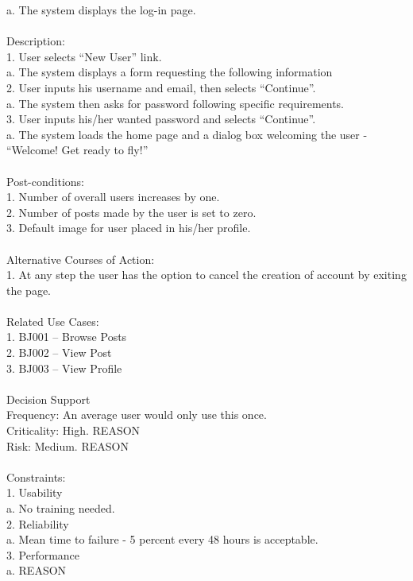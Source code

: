 \documentclass{report}
\begin{document}
	a.	The system displays the log-in page.\\
\\
Description: \\
1.	User selects “New User” link. \\
	a.	The system displays a form requesting the following information\\
2.	User inputs his username and email, then selects “Continue”. \\
	a.	The system then asks for password following specific requirements.\\
3.	User inputs his/her wanted password and selects “Continue”. \\
	a.	The system loads the home page and a dialog box welcoming the user - “Welcome! Get ready to fly!”\\
\\
Post-conditions: \\
1.	Number of overall users increases by one.\\
2.	Number of posts made by the user is set to zero.\\
3.	Default image for user placed in his/her profile.\\
\\
Alternative Courses of Action:\\
1.	At any step the user has the option to cancel the creation of account by exiting the page.\\
\\
Related Use Cases: \\
1.	BJ001 – Browse Posts\\
2.	BJ002 – View Post\\
3.	BJ003 – View Profile\\
\\
Decision Support\\
     Frequency: An average user would only use this once.\\
     Criticality: High. REASON\\
     Risk: Medium. REASON\\
\\
Constraints:\\
1.	Usability\\
a.	No training needed.\\
2.	Reliability\\
a.	Mean time to failure - 5 percent every 48 hours is acceptable.\\
3.	Performance \\
a.	REASON\\
\end{document}
